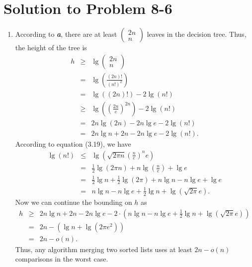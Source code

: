 \documentclass[a4paper, fleqn]{article}
\begin{document}
\section*{Solution to Problem 8-6}
\begin{enumerate}
\renewcommand{\labelenumi}{\itshape \bfseries \alph{enumi}.}


\item  %

According to \textit{\textbf{a}}, there are at least 
$\left(\!\!\begin{array}{c}2n \\ n\end{array}\!\!\right)$ 
leaves in the decision tree. Thus, the height of the tree is
\begin{eqnarray*}
h 
& \geq & \lg\left(\!\!\begin{array}{c}2n \\ n\end{array}\!\!\right) \\
& = & \lg\left(\frac{(2n)!}{(n!)^2}\right) \\
& = & \lg((2n)!) - 2\lg(n!) \\
& \geq & \lg\left(\left(\frac{2n}{e}\right)^{2n}\right) - 2\lg(n!) \\
& = & 2n\lg(2n) - 2n \lg e - 2\lg(n!) \\
& = & 2n \lg n + 2n - 2n \lg e - 2\lg(n!).
\end{eqnarray*}
According to equation (3.19), we have
\begin{eqnarray*}
\lg(n!)
& \leq & \lg\left(\sqrt{2 \pi n} \left(\frac{n}{e}\right)^n e\right) \\
& = & \frac{1}{2}\lg(2 \pi n) + n \lg\left(\frac{n}{e}\right) + \lg e\\
& = & \frac{1}{2} \lg n + \frac{1}{2}\lg(2\pi) + n \lg n - n \lg e + \lg e\\
& = & n \lg n - n \lg e + \frac{1}{2} \lg n + \lg(\sqrt{2\pi}e).
\end{eqnarray*}
Now we can continue the bounding on $h$ as
\begin{eqnarray*}
h
& \geq &  2n \lg n + 2n - 2n \lg e - 
          2\cdot\left(n \lg n - n \lg e + \frac{1}{2} \lg n + \lg(\sqrt{2\pi}e)\right) \\
& = & 2n - \left(\lg n + \lg(2 \pi e^2)\right) \\
& = & 2n - o(n).
\end{eqnarray*}
Thus, any algorithm merging two sorted lists uses at least $2n - o(n)$ comparisons 
in the worst case.




\end{enumerate}
\end{document}
